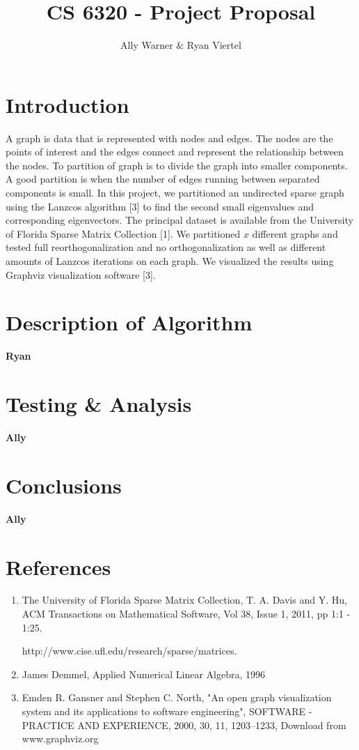 \documentclass[11pt, oneside]{article}   	%
\title{CS 6320 - Project Proposal}
\author{Ally Warner \& Ryan Viertel}
\begin{document}
\maketitle

\section{Introduction}
A graph is data that is represented with nodes and edges. The nodes are the points of interest and the edges connect and represent the relationship between the nodes. To partition of graph is to divide the graph into smaller components. A good partition is when the number of edges running between separated components is small. In this project, we partitioned an undirected sparse graph using the Lanzcos algorithm [3] to find the second small eigenvalues and corresponding eigenvectors.  The principal dataset is available from the University of Florida Sparse Matrix Collection [1]. We partitioned $x$ different graphs and tested full reorthogonalization and no orthogonalization as well as different amounts of Lanzcos iterations on each graph. We visualized the results using Graphviz visualization software [3].

\section{Description of Algorithm}

\textbf{Ryan}

\section{Testing \& Analysis}

\textbf{Ally}

\section{Conclusions}

\textbf{Ally}

\section{References}

\begin{enumerate}

\item The University of Florida Sparse Matrix Collection, T. A. Davis and Y. Hu, ACM Transactions on Mathematical Software, Vol 38, Issue 1, 2011, pp 1:1 - 1:25. 

http://www.cise.ufl.edu/research/sparse/matrices.

\item James Demmel, Applied Numerical Linear Algebra, 1996

\item Emden R. Gansner and Stephen C. North, "An open graph visualization system and its applications to software engineering", SOFTWARE - PRACTICE AND EXPERIENCE, 2000, 30, 11, 1203--1233, Download from www.graphviz.org

\end{enumerate}
\end{document}
